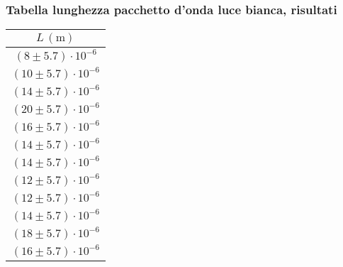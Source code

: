 \subsubsection{Tabella lunghezza pacchetto d'onda luce bianca, risultati}
    \begin{table}[H]
    \centering
        \begin{tabular}{|c|}
        \hline
        $ L \, (\text{m}) $ \\
        \hline
        $(8 \pm 5.7) \cdot 10^{-6}$ \\
        \hline
        $(10 \pm 5.7) \cdot 10^{-6}$ \\
        \hline
        $(14 \pm 5.7) \cdot 10^{-6}$ \\
        \hline
        $(20 \pm 5.7) \cdot 10^{-6}$ \\
        \hline
        $(16 \pm 5.7) \cdot 10^{-6}$ \\
        \hline
        $(14 \pm 5.7) \cdot 10^{-6}$ \\
        \hline
        $(14 \pm 5.7) \cdot 10^{-6}$ \\
        \hline
        $(12 \pm 5.7) \cdot 10^{-6}$ \\
        \hline
        $(12 \pm 5.7) \cdot 10^{-6}$ \\
        \hline
        $(14 \pm 5.7) \cdot 10^{-6}$ \\
        \hline
        $(18 \pm 5.7) \cdot 10^{-6}$ \\
        \hline
        $(16 \pm 5.7) \cdot 10^{-6}$ \\
        \hline
        \end{tabular}
    \end{table}
